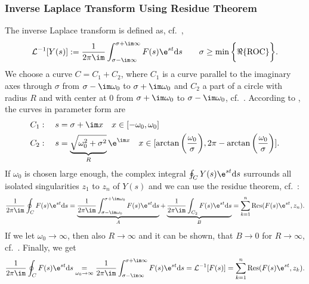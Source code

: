 \subsubsection{Inverse Laplace Transform Using Residue Theorem}
The inverse Laplace transform is defined as, cf.~\cite{UlrichWeber2017},
\begin{align}
	\mathcal{L}^{-1}[Y(s)]:=\frac{1}{2\pi\im}\int_{\sigma-\im\infty}^{\sigma+\im\infty}F(s)\e^{st}\mathrm{d}s\quad\quad \sigma \geq \min \bigg \{\Re \{\text{ROC}\} \bigg\}.
\end{align}
%
We choose a curve $C = C_1 + C_2$, where $C_1$ is a curve parallel to the imaginary axes through $\sigma$ from $\sigma -\im\omega_0$ to $\sigma + \im\omega_0$ and $C_2$ a part of a circle with radius $R$ and with center at $0$ from $\sigma +\im\omega_0$ to $\sigma - \im\omega_0$, cf.~\cite{UlrichWeber2017}.
According to \cite[Fig.~3.5]{UlrichWeber2017}, the curves in parameter form are
\begin{align}
	&C_1:\quad s = \sigma+\im x \quad x \in [-\omega_0,\omega_0] \\
	&C_2:\quad s = \underbrace{\sqrt{\omega_0^2+\sigma^2}}_R \e^{\im x} \quad x \in [\arctan\bigg (\frac{\omega_0}{\sigma}\bigg ) ,2\pi-\arctan\bigg ( \frac{\omega_0}{\sigma}\bigg ) ].
\end{align}
%
If $\omega_0$ is chosen large enough, the complex integral $\oint_CY(s)\e^{st}\mathrm{d}s$ surrounds all isolated singularities $z_1$ to $z_n$ of $Y(s)$ and we can use the residue theorem, cf.~\cite{UlrichWeber2017}:
\begin{align}
	\frac{1}{2\pi\im}\oint_C F(s)\e^{st}\mathrm{d}s=\underbrace{\frac{1}{2\pi\im}\int_{\sigma-\im\omega_0}^{\sigma+\im\omega_0}F(s)\e^{st}\mathrm{d}s}_{A}+\underbrace{\frac{1}{2\pi\im}\int_{C_2}F(s)\e^{st}\mathrm{d}s}_{B}=\sum_{k=1}^{n}\mathrm{Res}(F(s)\e^{st},z_n).
\end{align}
%
If we let $\omega_0\rightarrow\infty$, then also $R\rightarrow\infty$ and it can be shown, that $B \rightarrow 0$ for $R\rightarrow \infty$, cf.~\cite{UlrichWeber2017}.
%
Finally, we get
\begin{align}
\label{eq:InvLaplace2ResidueTheorem}
	\frac{1}{2\pi\im}\oint_C F(s)\e^{st}\mathrm{d}s\underset{\omega_0\rightarrow\infty}{=}\frac{1}{2\pi\im}\int_{\sigma-\im\infty}^{\sigma+\im\infty}F(s)\e^{st}\mathrm{d}s=\mathcal{L}^{-1}[F(s)]=\sum_{k=1}^{n}\mathrm{Res}(F(s)\e^{st},z_k).
\end{align}
